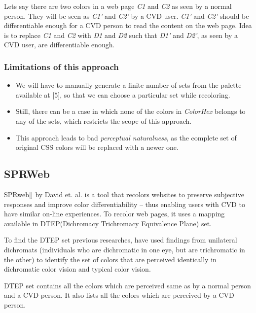 Lets say there are two colors in a web page \textit{C1} and \textit{C2} as seen by a normal person. They will be seen as \textit{C1'} and \textit{C2'} by a CVD user. \textit{C1'} and \textit{C2'} should be differentiable enough for a CVD person to read the content on the web page. Idea is to replace \textit{C1} and \textit{C2} with \textit{D1} and \textit{D2} such that \textit{D1'} and \textit{D2'}, as seen by a CVD user, are differentiable enough.





\subsubsection{Limitations of this approach}
\label{Limitatios}

\begin{itemize}
\item{We will have to manually generate a finite number of sets from the palette available at [5], so that we can choose a particular set while recoloring.} 
\item{Still, there can be a case in which none of the colors in \textit{ColorHex} belongs to any of the sets, which restricts the scope of this approach.}
\item{This approach leads to bad \textit{perceptual naturalness}, as the complete set of original CSS colors will be replaced with a newer one.}
\end{itemize}


\subsection{SPRWeb}
\label{SPRWeb}

SPRweb[] by David et. al. is a tool that recolors websites to preserve subjective responses and improve color differentiability – thus enabling users with CVD to have similar on-line experiences. To recolor web pages, it uses a mapping available in DTEP(Dichromacy Trichromacy Equivalence Plane) set.


To find the DTEP set previous researches, have used findings from unilateral dichromats (individuals who are dichromatic in one eye, but are trichromatic in the other) to identify the set of colors that are perceived identically in dichromatic color vision and typical color vision. 

DTEP set contains all the colors which are perceived same as by a normal person and a CVD person. It also lists all the colors which are perceived by a CVD person. 

